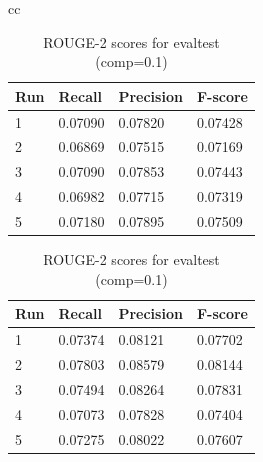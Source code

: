 \documentclass[11pt]{article}
\begin{document}
\begin{table}[!ht]
\begin{tabular}{cc}
\begin{minipage}{1.05\linewidth}
\centering
\caption*{ROUGE-2 scores for devtest (comp=0.1)}
\begin{tabular}{|l|l|l|l|}
\hline
Run   & Recall  & Precision & F-score \\ \hline
1 & 0.07090 & 0.07820   & 0.07428 \\ \hline
2 & 0.06869 & 0.07515   & 0.07169 \\ \hline
3 & 0.07090 & 0.07853   & 0.07443 \\ \hline
4 & 0.06982 & 0.07715   & 0.07319 \\ \hline
5 & 0.07180 & 0.07895   & 0.07509 \\ \hline
\end{tabular}
\end{minipage} 

\begin{minipage}{1.05\linewidth}
\centering
\caption*{ROUGE-2 scores for evaltest (comp=0.1)}
\begin{tabular}{|l|l|l|l|}
\hline
Run   & Recall  & Precision & F-score \\ \hline
1 & 0.07374 & 0.08121   & 0.07702 \\ \hline
2 & 0.07803 & 0.08579   & 0.08144 \\ \hline
3 & 0.07494 & 0.08264   & 0.07831 \\ \hline
4 & 0.07073 & 0.07828   & 0.07404 \\ \hline
5 & 0.07275 & 0.08022   & 0.07607 \\ \hline
\end{tabular}
\end{minipage}
\end{tabular}
\end{table}
\end{document}
